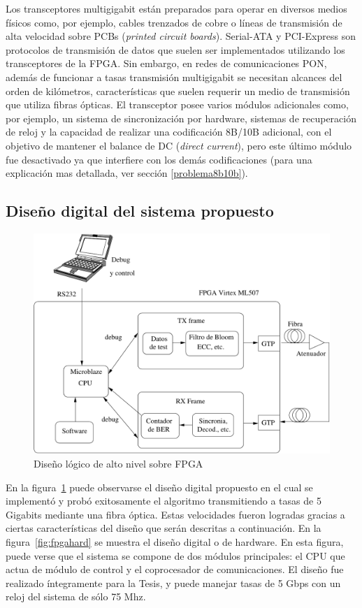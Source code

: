 Los transceptores multigigabit están preparados para operar en diversos medios físicos como, por ejemplo, cables trenzados de cobre o líneas de transmisión de alta velocidad sobre PCBs (\textit{printed circuit boards}). Serial-ATA \cite{serial2001high} y PCI-Express \cite{budruk2004pci} son protocolos de transmisión de datos que suelen ser implementados utilizando los transceptores de la FPGA. Sin embargo, en redes de comunicaciones PON, además de funcionar a tasas transmisión  multigigabit se necesitan alcances del orden de kilómetros, características que suelen requerir un medio de transmisión que utiliza fibras ópticas.  El transceptor posee varios módulos adicionales como, por ejemplo, un sistema de sincronización por hardware, sistemas de recuperación de reloj y la capacidad de realizar una codificación 8B/10B \cite{widmer1983dc} adicional, con el objetivo de mantener el balance de DC (\textit{direct current}), pero este último módulo fue desactivado ya que interfiere con los demás codificaciones (para una explicación mas detallada, ver sección \ref{problema8b10b}).

\subsection{Diseño digital del sistema propuesto}
\begin{figure}[t]
  \centering
    \includegraphics[width=6in]{graphs/fpgadesign.pdf}
\caption {Diseño lógico de alto nivel sobre FPGA}
\label{fig:fpgadesign}
\end{figure}

En la figura~\ref{fig:fpgadesign} puede observarse el diseño digital propuesto en el cual se implementó y probó exitosamente el algoritmo transmitiendo a tasas de 5 Gigabits mediante una fibra óptica.
Estas velocidades fueron logradas gracias a ciertas características del diseño que serán descritas a continuación. En la figura~\ref{fig:fpgahard} se muestra el diseño digital o de hardware. En esta figura, puede verse que el sistema se compone de dos módulos principales: el CPU que actua de módulo de control y el coprocesador de comunicaciones. El diseño fue realizado íntegramente para la Tesis, y puede manejar tasas de 5 Gbps con un reloj del sistema de sólo 75 Mhz.

